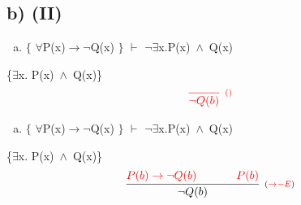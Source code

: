 \documentclass[aspectratio=43]{beamer}
\newcommand{\ria}{$\rightarrow$}
\newcommand{\fall}{$\forall$}
\newcommand{\ex}{$\exists$}
\newcommand{\nao}{$\neg$}
\newcommand{\nex}{\nao\ex}
\newcommand{\andd}{$\wedge$}
\begin{document}
    \subsection{b) (II)}
    
    \begin{frame}[fragile]
    	
    	\begin{enumerate}[b)]
			
			\item $\{$ \fall P(x)\ria \nao Q(x) $\}$ $\vdash$ \nex  x.P(x)\ \andd\ Q(x) \\ 
			
		\end{enumerate}
        \{\ex  x. P(x)\ \andd\ Q(x)\}
        \vspace{100pt}
        \[
        \begin{array}{c}
		
        	\textcolor{red}{
            \infer[_{()}]
            {$\nao$ Q(b)}
            {}
            }
		\end{array}
        \]
        
	\end{frame}
    
    \begin{frame}[fragile]
    	
    	\begin{enumerate}[b)]
			
			\item $\{$ \fall P(x)\ria \nao Q(x) $\}$ $\vdash$ \nex x.P(x)\ \andd\ Q(x) \\ 
			
		\end{enumerate}
        \{\ex  x. P(x)\ \andd\ Q(x)\}
        \vspace{95pt}
        \[
        \begin{array}{c}
		
        	\infer[_{(\textcolor{red}{\to-E})}]
            {$\nao$ Q(b)}
            {\textcolor{red}{
            P(b) \rightarrow \neg Q(b) 
            \hspace{35pt}
            P(b)
            }
            }
		\end{array}
        \]
        
	\end{frame}
    
\end{document}
